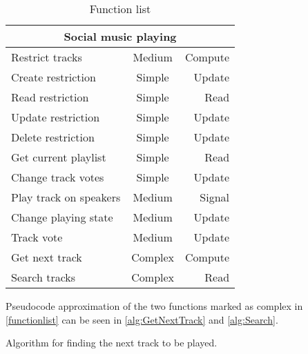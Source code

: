 \begin{table}[hbtp]
\centering
\begin{tabular}{lcr}
\toprule
\multicolumn{3}{c}{\textbf{Social music playing}} \\
\midrule
Restrict tracks                & Medium  & Compute \\
Create restriction             & Simple  & Update  \\
Read restriction               & Simple  & Read    \\
Update restriction             & Simple  & Update  \\
Delete restriction             & Simple  & Update  \\
Get current playlist           & Simple  & Read    \\
Change track votes             & Simple  & Update  \\
Play track on speakers         & Medium  & Signal  \\
Change playing state           & Medium  & Update  \\
Track vote                     & Medium  & Update  \\
Get next track                 & Complex & Compute \\
Search tracks                  & Complex & Read    \\
\bottomrule
\end{tabular}
\caption{Function list}
\label{table:functionlist}
\end{table}

Pseudocode approximation of the two functions marked as complex in \cref{functionlist} can be seen in \cref{alg:GetNextTrack} and \cref{alg:Search}.

\begin{algorithm}[htbp]
\caption{Algorithm for finding the next track to be played.}\label{alg:GetNextTrack}
\begin{algorithmic}[1]
		\EndIf{}
			\Else{} 
					\EndIf{}
				\EndIf{}
			\EndIf{}
		\EndFor{}
	\EndFunction{}
\end{algorithmic}
\end{algorithm}

